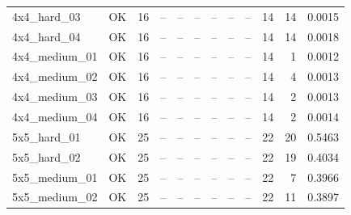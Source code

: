\begin{tabular}{l l r r r r r r r r r r }
4x4\_hard\_03 & OK & 16 & -- & -- & -- & -- & -- & -- & 14 & 14 & 0.0015 \\
4x4\_hard\_04 & OK & 16 & -- & -- & -- & -- & -- & -- & 14 & 14 & 0.0018 \\
4x4\_medium\_01 & OK & 16 & -- & -- & -- & -- & -- & -- & 14 & 1 & 0.0012 \\
4x4\_medium\_02 & OK & 16 & -- & -- & -- & -- & -- & -- & 14 & 4 & 0.0013 \\
4x4\_medium\_03 & OK & 16 & -- & -- & -- & -- & -- & -- & 14 & 2 & 0.0013 \\
4x4\_medium\_04 & OK & 16 & -- & -- & -- & -- & -- & -- & 14 & 2 & 0.0014 \\
5x5\_hard\_01 & OK & 25 & -- & -- & -- & -- & -- & -- & 22 & 20 & 0.5463 \\
5x5\_hard\_02 & OK & 25 & -- & -- & -- & -- & -- & -- & 22 & 19 & 0.4034 \\
5x5\_medium\_01 & OK & 25 & -- & -- & -- & -- & -- & -- & 22 & 7 & 0.3966 \\
5x5\_medium\_02 & OK & 25 & -- & -- & -- & -- & -- & -- & 22 & 11 & 0.3897 \\
\hline
\end{tabular}
